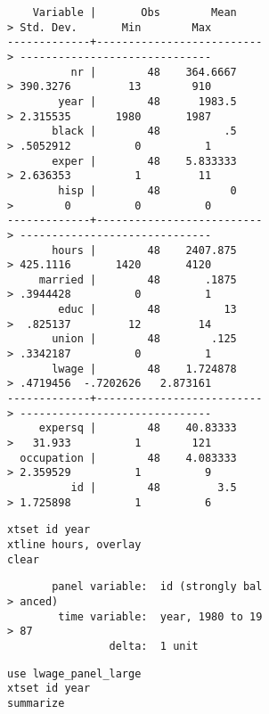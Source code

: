 \documentclass[]{article}
\begin{document}
\begin{verbatim}
    Variable |       Obs        Mean    
> Std. Dev.       Min        Max
-------------+--------------------------
> ------------------------------
          nr |        48    364.6667    
> 390.3276         13        910
        year |        48      1983.5    
> 2.315535       1980       1987
       black |        48          .5    
> .5052912          0          1
       exper |        48    5.833333    
> 2.636353          1         11
        hisp |        48           0    
>        0          0          0
-------------+--------------------------
> ------------------------------
       hours |        48    2407.875    
> 425.1116       1420       4120
     married |        48       .1875    
> .3944428          0          1
        educ |        48          13    
>  .825137         12         14
       union |        48        .125    
> .3342187          0          1
       lwage |        48    1.724878    
> .4719456  -.7202626   2.873161
-------------+--------------------------
> ------------------------------
     expersq |        48    40.83333    
>   31.933          1        121
  occupation |        48    4.083333    
> 2.359529          1          9
          id |        48         3.5    
> 1.725898          1          6
\end{verbatim}

\begin{verbatim}
xtset id year
xtline hours, overlay
clear
\end{verbatim}

\begin{verbatim}
       panel variable:  id (strongly bal
> anced)
        time variable:  year, 1980 to 19
> 87
                delta:  1 unit
\end{verbatim}

\begin{verbatim}
use lwage_panel_large
xtset id year
summarize
\end{verbatim}
\end{document}
